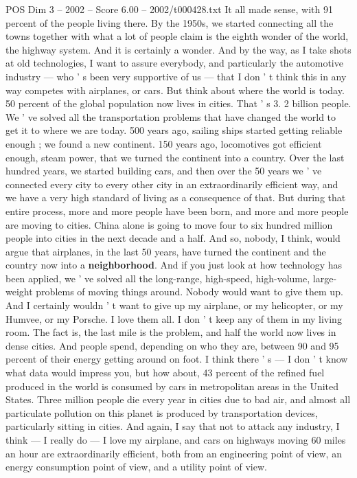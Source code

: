 \begin{textsample}{POS Dim 3 – 2002 – Score 6.00 – 2002/t000428.txt}
It all made sense, with 91 percent of the people living there.
By the 1950s, we started connecting all the towns together with what a lot of people claim is the eighth wonder of the world, the highway system.
And it is certainly a wonder.
And by the way, as I take shots at old technologies, I want to assure everybody, and particularly the automotive industry — who ' s been very supportive of us — that I don ' t think this in any way competes with airplanes, or cars.
But think about where the world is today. 50 percent of the global population now lives in cities.
That ' s 3. 2 billion people.
We ' ve solved all the transportation problems that have changed the world to get it to where we are today. 500 years ago, sailing ships started getting reliable enough ; we found a new continent. 150 years ago, locomotives got efficient enough, steam power, that we turned the continent into a country.
Over the last hundred years, we started building cars, and then over the 50 years we ' ve connected every city to every other city in an extraordinarily efficient way, and we have a very high standard of living as a consequence of that.
But during that entire process, more and more people have been born, and more and more people are moving to cities.
China alone is going to move four to six hundred million people into cities in the next decade and a half.
And so, nobody, I think, would argue that airplanes, in the last 50 years, have turned the continent and the country now into a \textbf{neighborhood}.
And if you just look at how technology has been applied, we ' ve solved all the long-range, high-speed, high-volume, large- weight problems of moving things around.
Nobody would want to give them up.
And I certainly wouldn ' t want to give up my airplane, or my helicopter, or my Humvee, or my Porsche.
I love them all.
I don ' t keep any of them in my living room.
The fact is, the last mile is the problem, and half the world now lives in dense cities.
And people spend, depending on who they are, between 90 and 95 percent of their energy getting around on foot.
I think there ' s — I don ' t know what data would impress you, but how about, 43 percent of the refined fuel produced in the world is consumed by cars in metropolitan areas in the United States.
Three million people die every year in cities due to bad air, and almost all particulate pollution on this planet is produced by transportation devices, particularly sitting in cities.
And again, I say that not to attack any industry, I think — I really do — I love my airplane, and cars on highways moving 60 miles an hour are extraordinarily efficient, both from an engineering point of view, an energy consumption point of view, and a utility point of view.

\end{textsample}
